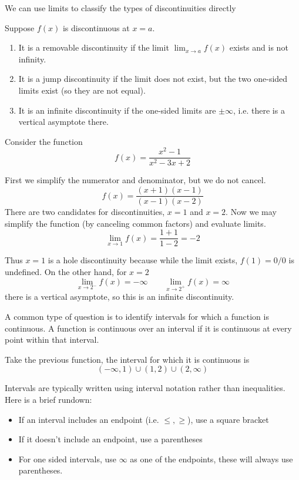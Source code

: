 We can use limits to classify the types of discontinuities directly
\begin{theorem}[Discontinuities]
	Suppose $f(x)$ is discontinuous at $x = a$.
	\begin{enumerate}
		\item It is a removable discontinuity if the limit $\lim_{x \to a} f(x)$ exists and is not infinity.
		\item It is a jump discontinuity if the limit does not exist, but the two one-sided limits exist (so they are not equal).
		\item It is an infinite discontinuity if the one-sided limits are $\pm \infty$, i.e. there is a vertical asymptote there.
	\end{enumerate}
\end{theorem}

\begin{example}
	Consider the function
	\[ f(x) = \frac{x^2 - 1}{x^2 - 3x + 2} \]

	First we simplify the numerator and denominator, but we do not cancel.
	\[ f(x) = \frac{(x + 1)(x - 1)}{(x -1)(x - 2)} \]
	There are two candidates for discontinuities, $x = 1$ and $x = 2$. Now we may simplify the function (by canceling common factors) and evaluate limits.
	\[ \lim_{x \to 1} f(x) = \frac{1 + 1}{1 - 2} = -2 \]
	
	Thus $x = 1$ is a hole discontinuity because while the limit exists, $f(1) = 0/0$ is undefined. On the other hand, for $x = 2$ 
	\[ \lim_{x \to 2^-} f(x) = -\infty \qquad \lim_{x \to 2^+} f(x) = \infty \]	
	there is a vertical asymptote, so this is an infinite discontinuity.
\end{example}

A common type of question is to identify intervals for which a function is continuous. A function is continuous over an interval if it is continuous at every point within that interval.

\begin{example}
	Take the previous function, the interval for which it is continuous is
	\[ (-\infty, 1) \cup (1, 2) \cup (2, \infty) \]
\end{example}

Intervals are typically written using interval notation rather than inequalities. Here is a brief rundown:
\begin{itemize}
	\item If an interval includes an endpoint (i.e. $\leq, \geq$), use a square bracket
	\item If it doesn't include an endpoint, use a parentheses
	\item For one sided intervals, use $\infty$ as one of the endpoints, these will always use parentheses.
\end{itemize}

